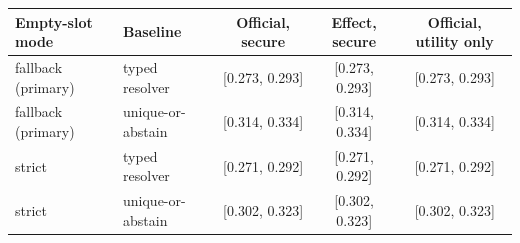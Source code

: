 \begin{tabular}{llccc}
\toprule
Empty-slot mode & Baseline & Official, secure & Effect, secure & Official, utility only \\
\midrule
fallback (primary) & typed resolver & [0.273, 0.293] & [0.273, 0.293] & [0.273, 0.293] \\
fallback (primary) & unique-or-abstain & [0.314, 0.334] & [0.314, 0.334] & [0.314, 0.334] \\
strict & typed resolver & [0.271, 0.292] & [0.271, 0.292] & [0.271, 0.292] \\
strict & unique-or-abstain & [0.302, 0.323] & [0.302, 0.323] & [0.302, 0.323] \\
\bottomrule
\end{tabular}
